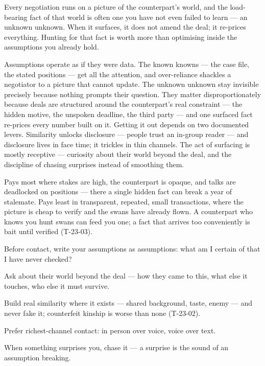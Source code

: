 \begin{core}
Every negotiation runs on a picture of the counterpart's world, and the load-bearing fact of that world is often one you have not even failed to learn --- an unknown unknown. When it surfaces, it does not amend the deal; it re-prices everything. Hunting for that fact is worth more than optimising inside the assumptions you already hold.
\end{core}
\begin{mechanism}
Assumptions operate as if they were data. The known knowns --- the case file, the stated positions --- get all the attention, and over-reliance shackles a negotiator to a picture that cannot update. The unknown unknown stay invisible precisely because nothing prompts their question. They matter disproportionately because deals are structured around the counterpart's real constraint --- the hidden motive, the unspoken deadline, the third party --- and one surfaced fact re-prices every number built on it. Getting it out depends on two documented levers. Similarity unlocks disclosure --- people trust an in-group reader --- and disclosure lives in face time; it trickles in thin channels. The act of surfacing is mostly receptive --- curiosity about their world beyond the deal, and the discipline of chasing surprises instead of smoothing them.
\end{mechanism}
\begin{conditions}
Pays most where stakes are high, the counterpart is opaque, and talks are deadlocked on positions --- there a single hidden fact can break a year of stalemate. Pays least in transparent, repeated, small transactions, where the picture is cheap to verify and the swans have already flown. A counterpart who knows you hunt swans can feed you one; a fact that arrives too conveniently is bait until verified (T-23-03).
\end{conditions}
\begin{application}
  \item Before contact, write your assumptions as assumptions: what am I certain of that I have never checked?
  \item Ask about their world beyond the deal --- how they came to this, what else it touches, who else it must survive.
  \item Build real similarity where it exists --- shared background, taste, enemy --- and never fake it; counterfeit kinship is worse than none (T-23-02).
  \item Prefer richest-channel contact: in person over voice, voice over text.
  \item When something surprises you, chase it --- a surprise is the sound of an assumption breaking.
\end{application}
